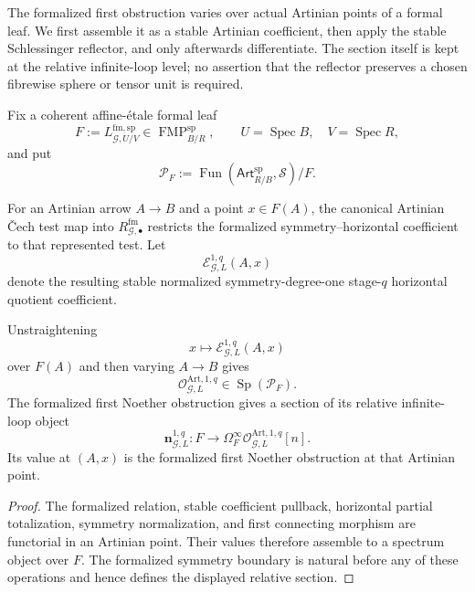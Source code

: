 The formalized first obstruction varies over actual Artinian points of a formal
leaf.  We first assemble it as a stable Artinian coefficient, then apply the stable
Schlessinger reflector, and only afterwards differentiate.  The section itself is
kept at the relative infinite-loop level; no assertion that the reflector preserves
a chosen fibrewise sphere or tensor unit is required.

Fix a coherent affine-\'etale formal leaf
\[
F
:=
L_{\mathcal G,U/V}^{\mathrm{fm},\mathrm{sp}}
\in
\operatorname{FMP}^{\mathrm{sp}}_{B/R},
\qquad
U=\operatorname{Spec}B,\quad
V=\operatorname{Spec}R,
\]
and put
\[
\mathcal P_F
:=
\operatorname{Fun}
\left(
\mathsf{Art}^{\mathrm{sp}}_{R/B},\mathcal S
\right)/F.
\]

For an Artinian arrow $A\to B$ and a point $x\in F(A)$, the canonical Artinian
\v{C}ech test map into $R_{\mathcal G,\bullet}^{\mathrm{fm}}$ restricts the
formalized symmetry--horizontal coefficient to that represented test.  Let
\[
\mathcal E_{\mathcal G,L}^{1,q}(A,x)
\]
denote the resulting stable normalized symmetry-degree-one stage-$q$ horizontal
quotient coefficient.

\begin{construction}
\label{constr:symmetry-noether-universal-formalized-first-obstruction-coefficient}
Unstraightening
\[
x\longmapsto
\mathcal E_{\mathcal G,L}^{1,q}(A,x)
\]
over $F(A)$ and then varying $A\to B$ gives
\[
\mathcal O_{\mathcal G,L}^{\mathrm{Art},1,q}
\in
\operatorname{Sp}(\mathcal P_F).
\]
The formalized first Noether obstruction gives a section of its relative
infinite-loop object
\[
\boxed{
\mathbf n_{\mathcal G,L}^{1,q}:
F
\longrightarrow
\Omega_F^\infty
\mathcal O_{\mathcal G,L}^{\mathrm{Art},1,q}[n].
}
\]
Its value at $(A,x)$ is the formalized first Noether obstruction at that Artinian
point.
\end{construction}

\begin{proof}
The formalized relation, stable coefficient pullback, horizontal partial
totalization, symmetry normalization, and first connecting morphism are functorial in
an Artinian point.  Their values therefore assemble to a spectrum object over
$F$.  The formalized symmetry boundary is natural before any of these operations and
hence defines the displayed relative section.
\end{proof}

